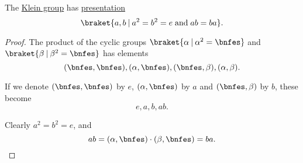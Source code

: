 \begin{proposition}\label{thm:klein_four_group_presentation}
  The \hyperref[def:klein_four_group]{Klein group} has \hyperref[def:group_presentation]{presentation}
  \begin{equation}\label{eq:thm:klein_four_group_presentation}
    \braket{ a, b \given a^2 = b^2 = e \T{and} ab = ba }.
  \end{equation}
\end{proposition}
\begin{proof}
  The product of the cyclic groups \( \braket{ \alpha \given \alpha^2 = \bnfes } \) and \( \braket{ \beta \given \beta^2 = \bnfes } \) has elements
  \begin{equation*}
    (\bnfes, \bnfes), (\alpha, \bnfes), (\bnfes, \beta), (\alpha, \beta).
  \end{equation*}

  If we denote \( (\bnfes, \bnfes) \) by \( e \), \( (\alpha, \bnfes) \) by \( a \) and \( (\bnfes, \beta) \) by \( b \), these become
  \begin{equation*}
    e, a, b, ab.
  \end{equation*}

  Clearly \( a^2 = b^2 = e \), and
  \begin{equation*}
    ab = (\alpha, \bnfes) \cdot (\beta, \bnfes) = ba.
  \end{equation*}
\end{proof}

